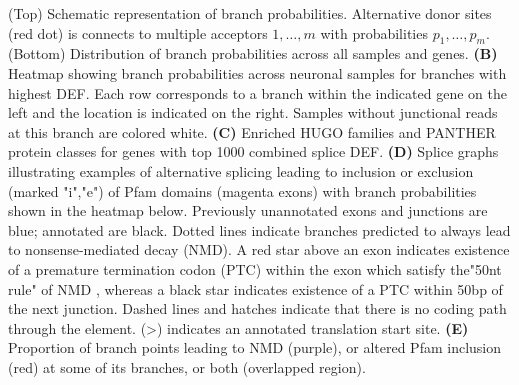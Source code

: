  (Top) Schematic representation of branch probabilities. Alternative donor sites (red dot) is connects to multiple acceptors $1,\ldots, m$ with probabilities $p_{1},\ldots,p_{m}$. (Bottom) Distribution of branch probabilities across all samples and genes. \textbf{(B)} Heatmap showing branch probabilities across neuronal samples for branches with highest DEF. Each row corresponds to a branch within the indicated gene on the left and the location is indicated on the right. Samples without junctional reads at this branch are colored white. \textbf{(C)} Enriched HUGO families and PANTHER protein classes for genes with top 1000 combined splice DEF. \textbf{(D)} Splice graphs illustrating examples of alternative splicing leading to inclusion or exclusion (marked "i","e") of Pfam domains (magenta exons) with branch probabilities shown in the heatmap below. Previously unannotated exons and junctions are blue; annotated are black. Dotted lines indicate branches predicted to always lead to nonsense-mediated decay (NMD). A red star above an exon indicates existence of a premature termination codon (PTC) within the exon which satisfy the"50nt rule" of NMD \citep{Nagy_1998}, whereas a black star indicates existence of a PTC within 50bp of the next junction. Dashed lines and hatches indicate that there is no coding path through the element. (>) indicates an annotated translation start site. \textbf{(E)} Proportion of branch points leading to NMD (purple), or altered Pfam inclusion (red) at some of its branches, or both (overlapped region).
